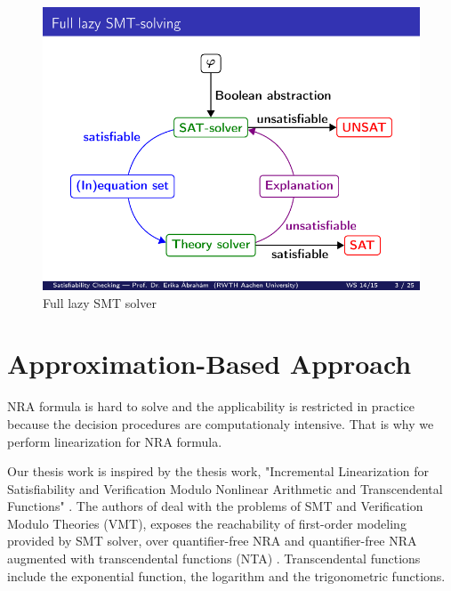 \begin{figure}[ht!]
  \centering
  \includegraphics[width=1\linewidth]{./figures/FullLazySMT.pdf}
  \caption{Full lazy SMT solver \cite{lec:satchecking5a}}
  \label{fig:FullLazySMT}
\end{figure}
\section{Approximation-Based Approach}
\label{sec:Approximation_Based_Approach}
NRA formula is hard to solve and the applicability is restricted in practice because the decision procedures are computationaly intensive.
That is why we perform linearization for NRA formula.\newline

\noindent Our thesis work is inspired by the thesis work, "Incremental Linearization for Satisfiability and Verification Modulo Nonlinear Arithmetic and Transcendental Functions" \cite{Cimatti:2018:ILS:3274693.3230639}.
The authors of \cite{Cimatti:2018:ILS:3274693.3230639} deal with the problems of SMT and Verification Modulo Theories (VMT), exposes the reachability of first-order
modeling provided by SMT solver, over  quantifier-free NRA and quantifier-free NRA augmented with  transcendental functions (NTA) \cite{abdulla2013reachability}.
Transcendental functions include the exponential function, the logarithm and the trigonometric functions.\newline

